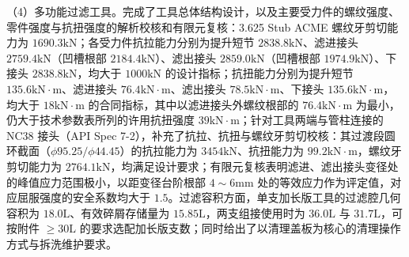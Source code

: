 （4）多功能过滤工具。完成了工具总体结构设计，以及主要受力件的螺纹强度、零件强度与抗扭强度的解析校核和有限元复核：3.625 Stub ACME 螺纹牙剪切能力为 $1690.3\mathrm{kN}$；各受力件抗拉能力分别为提升短节 $2838.8\mathrm{kN}$、滤进接头 $2759.4\mathrm{kN}$（凹槽根部 $2184.4\mathrm{kN}$）、滤出接头 $2859.0\mathrm{kN}$（凹槽根部 $1974.9\mathrm{kN}$）、下接头 $2838.8\mathrm{kN}$，均大于 $1000\mathrm{kN}$ 的设计指标；抗扭能力分别为提升短节 $135.6\mathrm{kN\cdot m}$、滤进接头 $76.4\mathrm{kN\cdot m}$、滤出接头 $78.5\mathrm{kN\cdot m}$、下接头 $135.6\mathrm{kN\cdot m}$，均大于 $18\mathrm{kN\cdot m}$ 的合同指标，其中以滤进接头外螺纹根部的 $76.4\mathrm{kN\cdot m}$ 为最小，仍大于技术参数表所列的许用抗扭强度 $39\mathrm{kN\cdot m}$；针对工具两端与管柱连接的 NC38 接头（API Spec 7-2），补充了抗拉、抗扭与螺纹牙剪切校核：其过渡段圆环截面（$\phi 95.25/\phi 44.45$）的抗拉能力为 $3454\mathrm{kN}$、抗扭能力为 $99.2\mathrm{kN\cdot m}$，螺纹牙剪切能力为 $2764.1\mathrm{kN}$，均满足设计要求；有限元复核表明滤进、滤出接头变径处的峰值应力范围极小，以距变径台阶根部 $4\sim6\mathrm{mm}$ 处的等效应力作为评定值，对应屈服强度的安全系数均大于 $1.5$。过滤容积方面，单支加长版工具的过滤腔几何容积为 $18.0\mathrm{L}$、有效碎屑存储量为 $15.85\mathrm{L}$，两支组接使用时为 $36.0\mathrm{L}$ 与 $31.7\mathrm{L}$，可按附件 $\ge 30\mathrm{L}$ 的要求选配加长版支数；同时给出了以清理盖板为核心的清理操作方式与拆洗维护要求。

